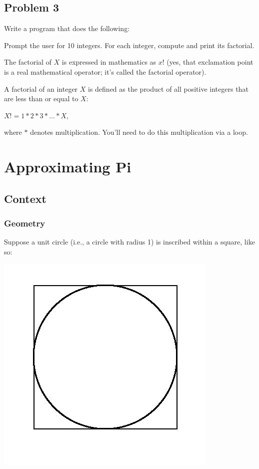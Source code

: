 \documentclass{article}
\newenvironment{hint}
    {\begin{tcolorbox}[title=Hint,colframe=white!70!blue,colback=white]}
    {\end{tcolorbox}}
\begin{document}
\subsection{Problem 3}

Write a program that does the following:

Prompt the user for 10 integers. For each integer, compute and print its factorial.

\begin{hint}
    The factorial of $X$ is expressed in mathematics as $x!$ (yes, that exclamation point is a real mathematical operator; it's called the factorial operator).
    
    \vspace{6pt}
    
    A factorial of an integer $X$ is defined as the product of all positive integers that are less than or equal to $X$:

    \vspace{6pt}
    
    $X! = 1 * 2 * 3 * ... * X,$

    \vspace{6pt}

    where $*$ denotes multiplication. You'll need to do this multiplication via a loop.
\end{hint}

\section{Approximating Pi}

\subsection{Context}

\subsubsection{Geometry}

Suppose a unit circle (i.e., a circle with radius 1) is inscribed within a square, like so:

\includegraphics[width=0.5\columnwidth]{res/Circle-inscribed-in-a-square.jpg}
\end{document}
